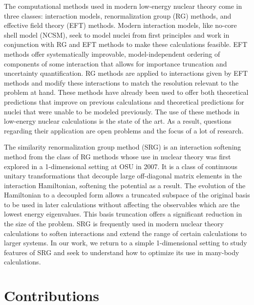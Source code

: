 The computational methods used in modern low-energy nuclear theory come in three classes: interaction models, renormalization group (RG) methods, and effective field theory (EFT) methods. Modern interaction models, like no-core shell model (NCSM), seek to model nuclei from first principles and work in conjunction with RG and EFT methods to make these calculations feasible. EFT methods offer systematically improvable, model-independent ordering of components of some interaction that allows for importance truncation and uncertainty quantification. RG methods are applied to interactions given by EFT methods and modify these interactions to match the resolution relevant to the problem at hand. These methods have already been used to offer both theoretical predictions that improve on previous calculations and theoretical predictions for nuclei that were unable to be modeled previously. The use of these methods in low-energy nuclear calculations is the state of the art. As a result, questions regarding their application are open problems and the focus of a lot of research. %

The similarity renormalization group method (SRG) is an interaction softening method from the class of RG methods whose use in nuclear theory was first explored in a 1-dimensional setting at OSU in 2007. It is a class of continuous unitary transformations that decouple large off-diagonal matrix elements in the interaction Hamiltonian, softening the potential as a result. The evolution of the Hamiltonian to a decoupled form allows a truncated subspace of the original basis to be used in later calculations without affecting the observables which are the lowest energy eigenvalues. This basis truncation offers a significant reduction in the size of the problem. SRG is frequently used in modern nuclear theory calculations to soften interactions and extend the range of certain calculations to larger systems. In our work, we return to a simple 1-dimensional setting to study features of SRG and seek to understand how to optimize its use in many-body calculations.

\section{Contributions}

